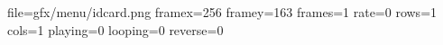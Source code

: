 file=gfx/menu/idcard.png
framex=256
framey=163
frames=1
rate=0
rows=1
cols=1
playing=0
looping=0
reverse=0